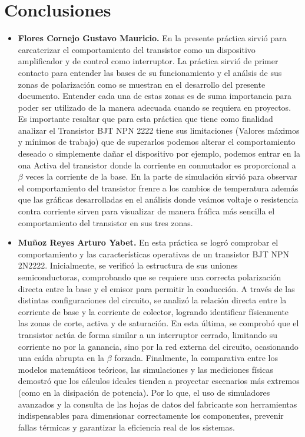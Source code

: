 \documentclass[journal]{IEEEtran}
\begin{document}
\section{Conclusiones}
\begin{itemize}
    \item \textbf{Flores Cornejo Gustavo Mauricio.}
    \newline 
    En la presente práctica sirvió para carcaterizar el comportamiento del transistor como un dispositivo amplificador y de control como interruptor. La práctica sirvió de primer contacto para entender las bases de su funcionamiento y el análsis de sus zonas de polarización como se muestran en el desarrollo del presente documento. Entender cada una de estas zonas es de suma importancia para poder ser utilizado de la manera adecuada cuando se requiera en proyectos.
    Es importante resaltar que para esta práctica que tiene como finalidad analizar el Transistor BJT NPN 2222 tiene sus limitaciones (Valores máximos y mínimos de trabajo) que de superarlos podemos alterar el comportamiento deseado o simplemente dañar el dispositivo por ejemplo, podemos entrar en la ona Activa del transistor donde la corriente en conmutador es proporcional a $\beta$ veces la corriente de la base. En la parte de simulación sirvió para observar el comportamiento del transistor frenre a los cambios de temperatura además que las gráficas
    desarrolladas en el análisis donde veámos voltaje o resistencia contra corriente sirven para visualizar de manera fráfica más sencilla el comportamiento del transistor en sus tres zonas.
    \newline 
    \item \textbf{Muñoz Reyes Arturo Yabet.}
    \newline En esta práctica se logró comprobar el comportamiento y las características operativas de un transistor BJT NPN 2N2222. Inicialmente, se verificó la estructura de sus uniones semiconductoras, comprobando que se requiere una correcta polarización directa entre la base y el emisor para permitir la conducción. A través de las distintas configuraciones del circuito, se analizó la relación directa entre la corriente de base y la corriente de colector, logrando identificar físicamente las zonas de corte, activa y de saturación. En esta última, se comprobó que el transistor actúa de forma similar a un interruptor cerrado, limitando su corriente no por la ganancia, sino por la red externa del circuito, ocasionando una caída abrupta en la $\beta$ forzada. 
    Finalmente, la comparativa entre los modelos matemáticos teóricos, las simulaciones y las mediciones físicas demostró que los cálculos ideales tienden a proyectar escenarios más extremos (como en la disipación de potencia). Por lo que, el uso de simuladores avanzados y la consulta de las hojas de datos del fabricante son herramientas indispensables para dimensionar correctamente los componentes, prevenir fallas térmicas y garantizar la eficiencia real de los sistemas.

\end{itemize}
\end{document}
